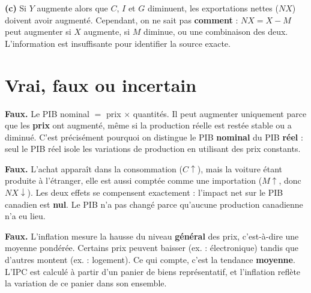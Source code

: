 \begin{reponse}
\textbf{(c)} Si $Y$ augmente alors que $C$, $I$ et $G$ diminuent, les exportations nettes ($NX$) doivent avoir augmenté. Cependant, on ne sait pas \textbf{comment} : $NX = X - M$ peut augmenter si $X$ augmente, si $M$ diminue, ou une combinaison des deux. L'information est insuffisante pour identifier la source exacte.
\end{reponse}

\section{Vrai, faux ou incertain}

\setcounter{shortcounter}{0}


\begin{reponse}
\textbf{Faux.} Le PIB nominal $=$ prix $\times$ quantités. Il peut augmenter uniquement parce que les \textbf{prix} ont augmenté, même si la production réelle est restée stable ou a diminué. C'est précisément pourquoi on distingue le PIB \textbf{nominal} du PIB \textbf{réel} : seul le PIB réel isole les variations de production en utilisant des prix constants.
\end{reponse}


\begin{reponse}
\textbf{Faux.} L'achat apparaît dans la consommation ($C\uparrow$), mais la voiture étant produite à l'étranger, elle est aussi comptée comme une importation ($M\uparrow$, donc $NX\downarrow$). Les deux effets se compensent exactement : l'impact net sur le PIB canadien est \textbf{nul}. Le PIB n'a pas changé parce qu'aucune production canadienne n'a eu lieu.
\end{reponse}


\begin{reponse}
\textbf{Faux.} L'inflation mesure la hausse du niveau \textbf{général} des prix, c'est-à-dire une moyenne pondérée. Certains prix peuvent baisser (ex. : électronique) tandis que d'autres montent (ex. : logement). Ce qui compte, c'est la tendance \textbf{moyenne}. L'IPC est calculé à partir d'un panier de biens représentatif, et l'inflation reflète la variation de ce panier dans son ensemble.
\end{reponse}

